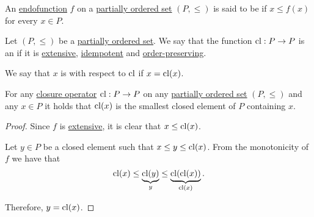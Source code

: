 \begin{definition}\label{def:extensive_function}
  An \hyperref[def:multi_valued_function/endofunction]{endofunction} \( f \) on a \hyperref[def:partially_ordered_set]{partially ordered set} \( (P, \leq) \) is said to be  if \( x \leq f(x) \) for every \( x \in P \).
\end{definition}

\begin{definition}\label{def:closure_operator}
  Let \( (P, \leq) \) be a \hyperref[def:partially_ordered_set]{partially ordered set}. We say that the function \( \operatorname{cl}: P \to P \) is an  if it is \hyperref[def:extensive_function]{extensive}, \hyperref[def:magma/idempotent]{idempotent} and \hyperref[def:order_homomorphism/increasing]{order-preserving}.

  We say that \( x \) is  with respect to \( \operatorname{cl} \) if \( x = \operatorname{cl}(x) \).
\end{definition}

\begin{proposition}\label{thm:closure_operator_minimality}
  For any \hyperref[def:closure_operator]{closure operator} \( \operatorname{cl}: P \to P \) on any \hyperref[def:partially_ordered_set]{partially ordered set} \( (P, \leq) \) and any \( x \in P \) it holds that \( \operatorname{cl}(x) \) is the smallest closed element of \( P \) containing \( x \).
\end{proposition}
\begin{proof}
  Since \( f \) is \hyperref[def:extensive_function]{extensive}, it is clear that \( x \leq \operatorname{cl}(x) \).

  Let \( y \in P \) be a closed element such that \( x \leq y \leq \operatorname{cl}(x) \). From the monotonicity of \( f \) we have that
  \begin{equation*}
    \operatorname{cl}(x) \leq \underbrace{\operatorname{cl}(y)}_{y} \leq \underbrace{\operatorname{cl}(\operatorname{cl}(x))}_{\operatorname{cl}(x)}.
  \end{equation*}

  Therefore, \( y = \operatorname{cl}(x) \).
\end{proof}

